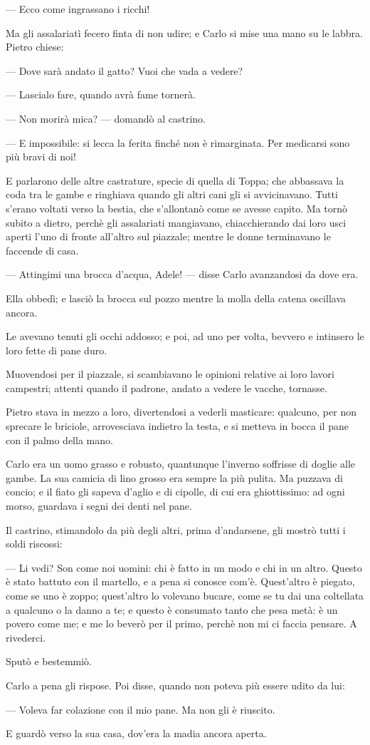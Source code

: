— Ecco come ingrassano i ricchi!

Ma gli assalariatì fecero finta di non udire; e Carlo si mise una mano su le labbra. Pietro chiese:

— Dove sarà andato il gatto? Vuoi che vada a vedere?

— Lascialo fare, quando avrà fame tornerà.

— Non morirà mica? — domandò al castrino.

— E impossibile: si lecca la ferita finché non è rimarginata. Per medicarsi sono più bravi di noi!

E parlarono delle altre castrature, specie di quella di Toppa; che abbassava la coda tra le gambe e ringhiava quando gli altri cani gli si avvicinavano. Tutti s'erano voltati verso la bestia, che s'allontanò come se avesse capito. Ma tornò subito a dietro, perchè gli assalariati mangiavano, chiacchierando dai loro usci aperti l'uno di fronte all'altro sul piazzale; mentre le donne terminavano le faccende di casa.

— Attingimi una brocca d'acqua, Adele! — disse Carlo avanzandosi da dove era.

Ella obbedì; e lasciò la brocca sul pozzo mentre la molla della catena oscillava ancora.

Le avevano tenuti gli occhi addosso; e poi, ad uno per volta, bevvero e intinsero le loro fette di pane duro.

Muovendosi per il piazzale, si scambiavano le opinioni relative ai loro lavori campestri; attenti quando il padrone, andato a vedere le vacche, tornasse.

Pietro stava in mezzo a loro, divertendosi a vederli masticare: qualcuno, per non sprecare le briciole, arrovesciava indietro la testa, e si metteva in bocca il pane con il palmo della mano.

Carlo era un uomo grasso e robusto, quantunque l'inverno soffrisse di doglie alle gambe. La sua camicia di lino grosso era sempre la più pulita. Ma puzzava di concio; e il fiato gli sapeva d'aglio e di cipolle, di cui era ghiottissimo: ad ogni morso, guardava i segni dei denti nel pane.

Il castrino, stimandolo da più degli altri, prima d'andarsene, gli mostrò tutti i soldi riscossi:

— Li vedi? Son come noi uomini: chi è fatto in un modo e chi in un altro. Questo è stato battuto con il martello, e a pena si conosce com'è. Quest'altro è piegato, come se uno è zoppo; quest'altro lo volevano bucare, come se tu dai una coltellata a qualcuno o la danno a te; e questo è consumato tanto che pesa metà: è un povero come me; e me lo beverò per il primo, perchè non mi ci faccia pensare. A rivederci.

Sputò e bestemmiò.

Carlo a pena gli rispose. Poi disse, quando non poteva più essere udito da lui:

— Voleva far colazione con il mio pane. Ma non gli è riuscito.

E guardò verso la sua casa, dov'era la madia ancora aperta.
